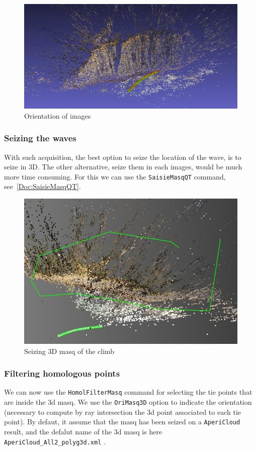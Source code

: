 \begin{figure}
\centering
\includegraphics[width=0.80\linewidth]{FIGS/GoProVideo/Aperi000.jpg}
\caption{Orientation of images}
\label{fig:GoProOri0}
\end{figure}


\subsubsection{Seizing the waves}

With such acquisition, the best option to seize the location of the wave, is to seize in 3D. The other alternative, 
seize them in each images, would be much more time consuming. For this we can use the {\tt SaisieMasqQT} command,
see~\ref{Doc:SaisieMasqQT}.


\begin{figure}
\centering
\includegraphics[width=0.80\linewidth]{FIGS/GoProVideo/Masq3D.jpg}
\caption{Seizing 3D masq  of the climb}
\label{fig:GoProOri0}
\end{figure}

\subsubsection{Filtering homologous points}

We can now use the  {\tt HomolFilterMasq} command for selecting the tie points that are inside the $3$d masq.
We use the {\tt OriMasq3D} option to indicate the orientation (necessary to compute by ray intersection the $3$d point
associated to each tie point). By defaut, it assume that the masq has been seized on a {\tt AperiCloud} result, and
the defalut name of the $3$d masq is  here {\tt AperiCloud\_All2\_polyg3d.xml} .


